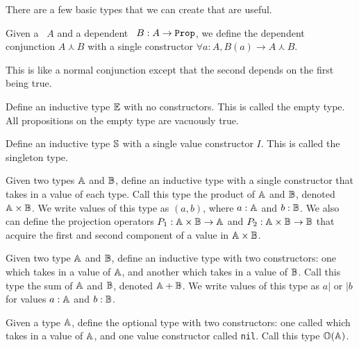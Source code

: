 \documentclass[../../math.tex]{subfiles}
\begin{document}
There are a few basic types that we can create that are useful.

\begin{definition}
    Given a \Prop\ $A$ and a dependent \Prop\ $B : A \rightarrow \Prop$, we
    define the dependent conjunction $A \curlywedge B$ with a single
    constructor $\forall a : A, B(a) \rightarrow A \curlywedge B$.
\end{definition}

This is like a normal conjunction except that the second \Prop depends on the
first \Prop being true.

\begin{definition}
    Define an inductive type $\E$ with no constructors.  This is called the
    empty type.  All propositions on the empty type are vacuously true.
\end{definition}

\begin{definition}
    Define an inductive type $\S$ with a single value constructor $I$.  This is
    called the singleton type.
\end{definition}

\begin{definition}
    Given two types $\A$ and $\B$, define an inductive type with a single
    constructor that takes in a value of each type.  Call this type the product
    of $\A$ and $\B$, denoted $\A \times \B$.  We write values of this type as
    $(a, b)$, where $a : \A$ and $b : \B$.  We also can define the projection
    operators $P_1 : \A \times \B \rightarrow \A$ and $P_2 : \A \times \B
    \rightarrow \B$ that acquire the first and second component of a value in
    $\A \times \B$.
\end{definition}

\begin{definition}
    Given two type $\A$ and $\B$, define an inductive type with two
    constructors: one which takes in a value of $\A$, and another which takes in
    a value of $\B$.  Call this type the sum of $\A$ and $\B$, denoted $\A +
    \B$.  We write values of this type as $a|$ or $|b$ for values $a : \A$ and
    $b : \B$.
\end{definition}

\begin{definition}
    Given a type $\A$, define the optional type with two constructors: one
    called  which takes in a value of $\A$, and one value constructor
    called \verb|nil|.  Call this type $\O(\A)$.
\end{definition}
\end{document}
